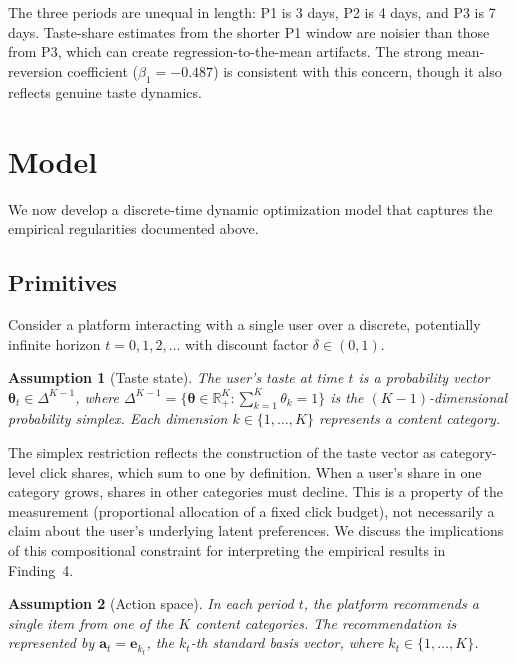 \documentclass[11pt]{article}
\newtheorem{assumption}{Assumption}
\newcommand{\R}{\mathbb{R}}
\begin{document}
The three periods are unequal in length: P1 is 3 days, P2 is 4 days, and P3 is 7 days. Taste-share estimates from the shorter P1 window are noisier than those from P3, which can create regression-to-the-mean artifacts. The strong mean-reversion coefficient ($\hat{\beta}_1 = -0.487$) is consistent with this concern, though it also reflects genuine taste dynamics.

\section{Model}
\label{sec:model}

We now develop a discrete-time dynamic optimization model that captures the empirical regularities documented above.

\subsection{Primitives}

Consider a platform interacting with a single user over a discrete, potentially infinite horizon $t = 0, 1, 2, \ldots$ with discount factor $\delta \in (0,1)$.

\begin{assumption}[Taste state]\label{as:taste}
The user's taste at time $t$ is a probability vector $\boldsymbol{\theta}_t \in \Delta^{K-1}$, where $\Delta^{K-1} = \{\boldsymbol{\theta} \in \R_+^K : \sum_{k=1}^K \theta_k = 1\}$ is the $(K{-}1)$-dimensional probability simplex. Each dimension $k \in \{1, \ldots, K\}$ represents a content category.
\end{assumption}

The simplex restriction reflects the construction of the taste vector as category-level click shares, which sum to one by definition. When a user's share in one category grows, shares in other categories must decline. This is a property of the measurement (proportional allocation of a fixed click budget), not necessarily a claim about the user's underlying latent preferences. We discuss the implications of this compositional constraint for interpreting the empirical results in Finding~4.

\begin{assumption}[Action space]\label{as:action}
In each period $t$, the platform recommends a single item from one of the $K$ content categories. The recommendation is represented by $\mathbf{a}_t = \mathbf{e}_{k_t}$, the $k_t$-th standard basis vector, where $k_t \in \{1, \ldots, K\}$.
\end{assumption}
\end{document}
